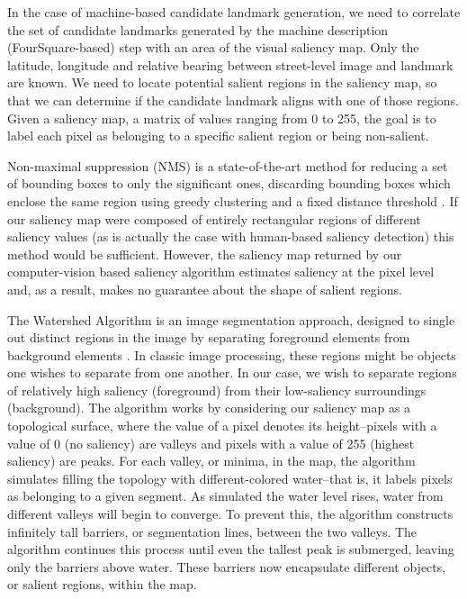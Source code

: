 In the case of machine-based candidate landmark generation, we need to correlate the set of candidate landmarks generated by the machine description (FourSquare-based) step with an area of the visual saliency map. Only the latitude, longitude and relative bearing between street-level image and landmark are known. We need to locate potential salient regions in the saliency map, so that we can determine if the candidate landmark aligns with one of those regions. 
Given a saliency map, a matrix of values ranging from 0 to 255, the goal is to label each pixel as belonging to a specific salient region or being non-salient. 

Non-maximal suppression (NMS) is a state-of-the-art method for reducing a set of bounding boxes to only the significant ones, discarding bounding boxes which enclose the same region using greedy clustering and a fixed distance threshold \cite{neubeck2006efficient}. If our saliency map were composed of entirely rectangular regions of different saliency values (as is actually the case with human-based saliency detection) this method would be sufficient. However, the saliency map returned by our computer-vision based saliency algorithm estimates saliency at the pixel level and, as a result, makes no guarantee about the shape of salient regions.

The Watershed Algorithm is an image segmentation approach, designed to single out distinct regions in the image by separating foreground elements from background elements \cite{barnes2014priority}. In classic image processing, these regions might be objects one wishes to separate from one another. In our case, we wish to separate regions of relatively high saliency (foreground) from their low-saliency surroundings (background). The algorithm works by considering our saliency map as a topological surface, where the value of a pixel denotes its height--pixels with a value of 0 (no saliency) are valleys and pixels with a value of 255 (highest saliency) are peaks. For each valley, or minima, in the map, the algorithm simulates filling the topology with different-colored water--that is, it labels pixels as belonging to a given segment. As simulated the water level rises, water from different valleys will begin to converge. To prevent this, the algorithm constructs infinitely tall barriers, or segmentation lines, between the two valleys. The algorithm continues this process until even the tallest peak is submerged, leaving only the barriers above water. These barriers now encapsulate different objects, or salient regions, within the map. 

